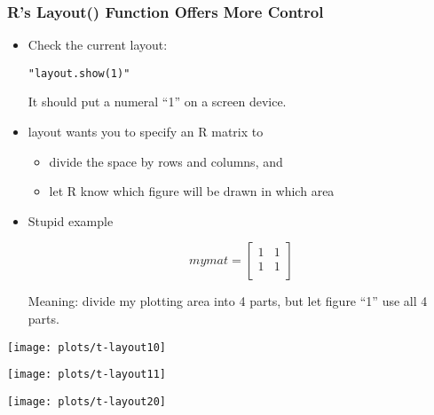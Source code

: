 \documentclass[11pt,english]{beamer}
\begin{document}
\begin{frame}[containsverbatim]
  \frametitle{R's Layout() Function Offers More Control}

  \begin{itemize}
  \item Check the current layout:

    \texttt{"layout.show(1)"}

    It should put a numeral ``1'' on a screen device.
  \item layout wants you to specify an R matrix to
    \begin{itemize}
    \item divide the space by rows and columns, and
    \item let R know which figure will be drawn in which area
    \end{itemize}

  \item Stupid example

    \begin{equation}
      mymat=\left[\begin{array}{cc}
          1 & 1\\
          1 & 1 \\
        \end{array}\right]\end{equation}


    Meaning: divide my plotting area into 4 parts, but let
    figure ``1'' use all 4 parts.


  \end{itemize}
\end{frame}


\begin{frame}[containsverbatim]


\texttt{[image: plots/t-layout10]}
\end{frame}


\begin{frame}[containsverbatim]

\texttt{[image: plots/t-layout11]}

\end{frame}


\begin{frame}[containsverbatim]

\texttt{[image: plots/t-layout20]}

\end{frame}
\end{document}
